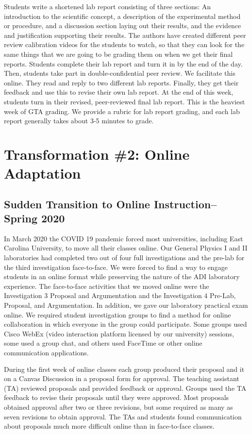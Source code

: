 \documentclass[aip, numerical, preprint]{revtex4-2}
\begin{document}
Students write a shortened lab report consisting of three sections: An introduction to the
scientific concept, a description of the experimental method or procedure, and a discussion
section laying out their results, and the evidence and justification supporting their results. 
The authors have created different peer review calibration videos for the students to watch, so
that they can look for the same things that we are going to be grading them on when we get
their final reports.  Students complete their lab report and turn it in by the end of the day.
Then, students take part in double-confidential peer review.  We facilitate this online.  They
read and reply to two different lab reports.  Finally, they get their feedback and use this to
revise their own lab report.  At the end of this week, students turn in their revised,
peer-reviewed final lab report.  This is the heaviest week of GTA grading.  We provide a rubric
for lab report grading, and each lab report generally takes about 3-5 minutes to grade.

\section{Transformation \#2: Online Adaptation}

\subsection{Sudden Transition to Online Instruction--Spring 2020}

In March 2020 the COVID 19 pandemic forced most universities, including East Carolina
University, to move all their classes online. Our General Physics I and II laboratories had
completed two out of four full investigations and the pre-lab for the third investigation
face-to-face. We were forced to find a way to engage students in an online format while
preserving the nature of the ADI laboratory experience. The face-to-face activities that we
moved online were the Investigation 3 Proposal and Argumentation and the Investigation 4
Pre-Lab, Proposal, and Argumentation. In addition, we gave our laboratory practical exam
online. We required student investigation groups to find a method for online collaboration in
which everyone in the group could participate. Some groups used Cisco WebEx (video interaction
platform licensed by our university) sessions, some used a group chat, and others used FaceTime
or other online communication applications.

During the first week of online classes each group produced their proposal and it on a Canvas
Discussion in a proposal form for approval. The teaching assistant (TA) reviewed proposals and
provided feedback or approval. Groups used the TA feedback to revise their proposals until they
were approved. Most proposals obtained approval after two or three revisions, but some required
as many as seven revisions to obtain approval. The TAs and students found communication about
proposals much more difficult online than in face-to-face classes.
\end{document}
